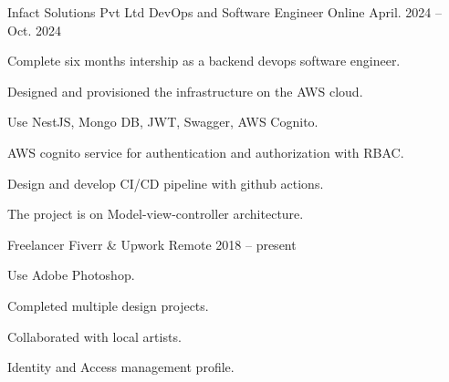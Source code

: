 

\begin{cventries}

  \cventry
    {Infact Solutions Pvt Ltd} %
    {DevOps and Software Engineer} %
    {Online} %
    {April. 2024 -- Oct. 2024} %
    {
      \begin{cvitems} %
        \item {Complete six months intership as a backend devops software engineer.}
        \item {Designed and provisioned the infrastructure on the AWS cloud.}
        \item {Use NestJS, Mongo DB, JWT, Swagger, AWS Cognito.}
        \item {AWS cognito service for authentication and authorization with RBAC.}
        \item {Design and develop CI/CD pipeline with github actions.}
        \item {The project is on Model-view-controller architecture.}
      \end{cvitems}
    }

  \cventry
    {Freelancer} %
    {Fiverr \& Upwork} %
    {Remote} %
    {2018 -- present} %
    {
      \begin{cvitems} %
        \item {Use Adobe Photoshop.}
        \item {Completed multiple design projects.}
        \item {Collaborated with local artists.}
        \item {Identity and Access management profile.}
      \end{cvitems}
    }


\end{cventries}
